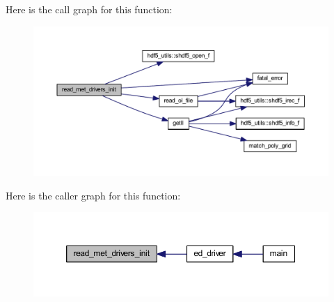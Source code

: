 Here is the call graph for this function\+:\nopagebreak
\begin{figure}[H]
\begin{center}
\leavevmode
\includegraphics[width=350pt]{ed__met__driver_8f90_ae08362e245fc684cc25b6da9753d7e8d_cgraph}
\end{center}
\end{figure}




Here is the caller graph for this function\+:\nopagebreak
\begin{figure}[H]
\begin{center}
\leavevmode
\includegraphics[width=350pt]{ed__met__driver_8f90_ae08362e245fc684cc25b6da9753d7e8d_icgraph}
\end{center}
\end{figure}


